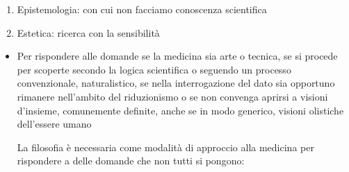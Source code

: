 \documentclass[]{article}
\begin{document}
\begin{enumerate}
\def\labelenumi{\arabic{enumi}.}
\item
  Epistemologia: con cui non facciamo conoscenza scientifica
\item
  Estetica: ricerca con la sensibilità
\end{enumerate}

\begin{itemize}
\item
  Per rispondere alle domande se la medicina sia arte o tecnica, se si
  procede per scoperte secondo la logica scientifica o seguendo un
  processo convenzionale, naturalistico, se nella interrogazione del
  dato sia opportuno rimanere nell'ambito del riduzionismo o se non
  convenga aprirsi a visioni d'insieme, comunemente definite, anche se
  in modo generico, visioni olistiche dell'essere umano

  La filosofia è necessaria come modalità di approccio alla medicina per
  rispondere a delle domande che non tutti si pongono:
\end{itemize}
\end{document}
